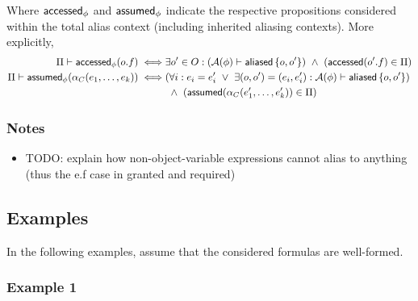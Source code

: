 \noindent
Where $\textsf{accessed}_\phi$ and $\textsf{assumed}_\phi$ indicate the respective propositions considered within the total alias context (including inherited aliasing contexts). More explicitly,
\begin{align*}
\Pi \entails \accessed_\phi(o.f) \iff &
  \exists o\p \in O :
  (\A(\phi) \entails \aliased\set{o, o\p}) \ \land \
  (\accessed(o\p.f) \in \Pi)
\\
\Pi \entails \assumed_\phi(\alpha_C(e_1, \dots, e_k)) \iff &
  (\forall i :
    e_i = e\p_i \ \lor \ %
    \exists (o, o\p) = (e_i, e\p_i) : \A(\phi) \entails \aliased\set{o, o\p}
  )
  \\ & \ \land \
  (\assumed(\alpha_C(e\p_1, \dots, e\p_k)) \in \Pi)
\end{align*}

\subsubsection{Notes}

\begin{itemize}
  \item TODO: explain how non-object-variable expressions cannot alias to anything (thus the e.f case in granted and required)
\end{itemize}

\subsection{Examples}

In the following examples, assume that the considered formulas are well-formed.

\subsubsection*{Example 1}

